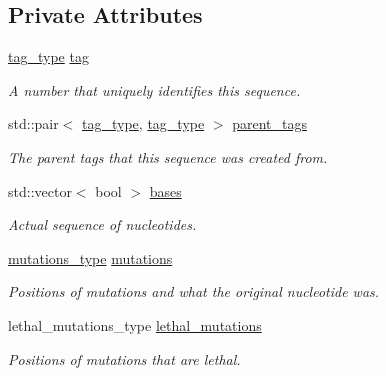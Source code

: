 \subsection*{Private Attributes}
\begin{DoxyCompactItemize}
\item 
\hyperlink{namespaceretrocombinator_afd7c6eb4293e8c4d12827609a9a34b9b}{tag\+\_\+type} \hyperlink{classretrocombinator_1_1Sequence_ae599e85a84a78e23d33f6c3085248726}{tag}
\begin{DoxyCompactList}\small\item\em A number that uniquely identifies this sequence. \end{DoxyCompactList}\item 
std\+::pair$<$ \hyperlink{namespaceretrocombinator_afd7c6eb4293e8c4d12827609a9a34b9b}{tag\+\_\+type}, \hyperlink{namespaceretrocombinator_afd7c6eb4293e8c4d12827609a9a34b9b}{tag\+\_\+type} $>$ \hyperlink{classretrocombinator_1_1Sequence_a023fef0801bd63048bf5c7b2442694cc}{parent\+\_\+tags}
\begin{DoxyCompactList}\small\item\em The parent tags that this sequence was created from. \end{DoxyCompactList}\item 
std\+::vector$<$ bool $>$ \hyperlink{classretrocombinator_1_1Sequence_a7c6072eaff9990a0bcaebcfa6287e3e0}{bases}
\begin{DoxyCompactList}\small\item\em Actual sequence of nucleotides. \end{DoxyCompactList}\item 
\hyperlink{classretrocombinator_1_1Sequence_a2abbaf2376f035a997e02c4afae9f476}{mutations\+\_\+type} \hyperlink{classretrocombinator_1_1Sequence_a07dd3101f7838d76300313ecfb97f3fc}{mutations}
\begin{DoxyCompactList}\small\item\em Positions of mutations and what the {\itshape original} nucleotide was. \end{DoxyCompactList}\item 
lethal\+\_\+mutations\+\_\+type \hyperlink{classretrocombinator_1_1Sequence_af5798b014aaeb7573197602dafb98818}{lethal\+\_\+mutations}
\begin{DoxyCompactList}\small\item\em Positions of mutations that are lethal. \end{DoxyCompactList}\end{DoxyCompactItemize}
